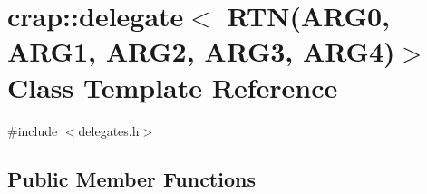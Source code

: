 \hypertarget{classcrap_1_1delegate_3_01_r_t_n_07_a_r_g0_00_01_a_r_g1_00_01_a_r_g2_00_01_a_r_g3_00_01_a_r_g4_08_4}{\section{crap\+:\+:delegate$<$ R\+T\+N(A\+R\+G0, A\+R\+G1, A\+R\+G2, A\+R\+G3, A\+R\+G4)$>$ Class Template Reference}
\label{classcrap_1_1delegate_3_01_r_t_n_07_a_r_g0_00_01_a_r_g1_00_01_a_r_g2_00_01_a_r_g3_00_01_a_r_g4_08_4}
}


{\ttfamily \#include $<$delegates.\+h$>$}

\subsection*{Public Member Functions}
